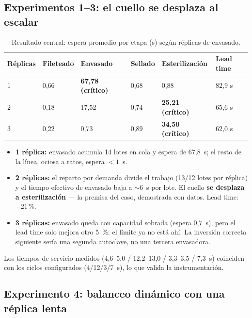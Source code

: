 \documentclass[12pt,a4paper]{article}
\begin{document}
\subsection{Experimentos 1--3: el cuello se desplaza al escalar}

\begin{table}[H]
\centering
\caption{Resultado central: espera promedio por etapa (s) según réplicas de envasado.}
\label{tab:central}
\small
\begin{tabular}{C{2.2cm} C{2.2cm} C{2.2cm} C{2.2cm} C{2.6cm} C{2.4cm}}
\toprule
\textbf{Réplicas} & \textbf{Fileteado} & \textbf{Envasado} & \textbf{Sellado} & \textbf{Esterilización} & \textbf{Lead time} \\
 & 0{,}66 & \textbf{67{,}78 (crítico)} & 0{,}68 & 0{,}88 & 82{,}9 s \\
2 & 0{,}18 & 17{,}52 & 0{,}74 & \textbf{25{,}21 (crítico)} & 65{,}6 s \\
3 & 0{,}22 & 0{,}73 & 0{,}89 & \textbf{34{,}50 (crítico)} & 62{,}0 s \\
\bottomrule
\end{tabular}
\end{table}

\begin{itemize}[leftmargin=*]
  \item \textbf{1 réplica:} envasado acumula 14 lotes en cola y espera de
        67{,}8~s; el resto de la línea, ociosa a ratos, espera $<1$~s.
  \item \textbf{2 réplicas:} el reparto por demanda divide el trabajo (13/12
        lotes por réplica) y el tiempo efectivo de envasado baja a $\sim$6~s
        por lote. El cuello \textbf{se desplaza a esterilización} — la premisa
        del caso, demostrada con datos. Lead time: $-21\,\%$.
  \item \textbf{3 réplicas:} envasado queda con capacidad sobrada (espera
        0{,}7~s), pero el lead time solo mejora otro 5~\%: el límite ya no
        está ahí. La inversión correcta siguiente sería una segunda autoclave,
        no una tercera envasadora.
\end{itemize}

Los tiempos de servicio medidos (4{,}6--5{,}0 / 12{,}2--13{,}0 / 3{,}3--3{,}5 /
7{,}3~s) coinciden con los ciclos configurados (4/12/3/7~s), lo que valida la
instrumentación.

\subsection{Experimento 4: balanceo dinámico con una réplica lenta}
\label{sec:exp4}
\end{document}

